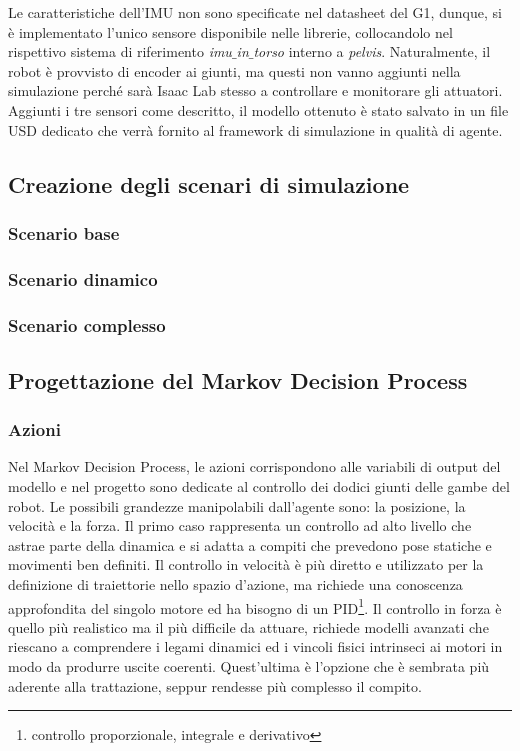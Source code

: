 Le caratteristiche dell'IMU non sono specificate nel datasheet del G1, dunque, si è implementato l'unico sensore disponibile nelle librerie, collocandolo nel rispettivo sistema di riferimento \textit{imu$\_$in$\_$torso} interno a \textit{pelvis}. Naturalmente, il robot è provvisto di encoder ai giunti, ma questi non vanno aggiunti nella simulazione perché sarà Isaac Lab stesso a controllare e monitorare gli attuatori. Aggiunti i tre sensori come descritto, il modello ottenuto è stato salvato in un file USD dedicato che verrà fornito al framework di simulazione in qualità di agente.


\subsection{Creazione degli scenari di simulazione}
\subsubsection{Scenario base}


\subsubsection{Scenario dinamico}


\subsubsection{Scenario complesso}


\subsection{Progettazione del Markov Decision Process}
\subsubsection{Azioni}
Nel Markov Decision Process, le azioni corrispondono alle variabili di output del modello e nel progetto sono dedicate al controllo dei dodici giunti delle gambe del robot. Le possibili grandezze manipolabili dall'agente sono: la posizione, la velocità e la forza. Il primo caso rappresenta un controllo ad alto livello che astrae parte della dinamica e si adatta a compiti che prevedono pose statiche e movimenti ben definiti. Il controllo in velocità è più diretto e utilizzato per la definizione di traiettorie nello spazio d'azione, ma richiede una conoscenza approfondita del singolo motore ed ha bisogno di un PID\footnote{controllo proporzionale, integrale e derivativo}. Il controllo in forza è quello più realistico ma il più difficile da attuare, richiede modelli avanzati che riescano a comprendere i legami dinamici ed i vincoli fisici intrinseci ai motori in modo da produrre uscite coerenti. Quest'ultima è l'opzione che è sembrata più aderente alla trattazione, seppur rendesse più complesso il compito.

